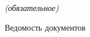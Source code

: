 \label{sec:appendix_e}

\begin{center}
	\normalfont\normalsize{\textit{(обязательное)}}

	\normalfont\normalsize{Ведомость документов}
\end{center}
\clearpage
